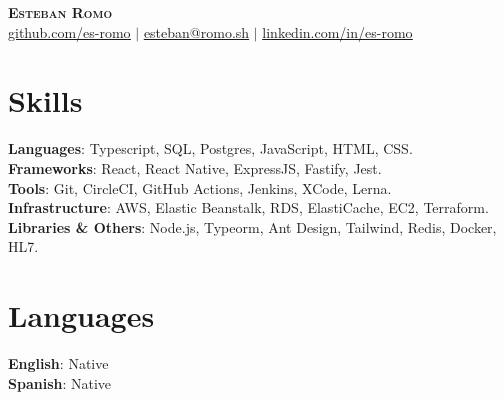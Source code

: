 \documentclass[letterpaper,11pt]{article}
\begin{document}
\begin{center}
    \textbf{\Huge \scshape Esteban Romo} \\ \vspace{1pt}
    \href{https://github.com/es-romo}{\underline{github.com/es-romo}} $|$ 
    \href{mailto:esteban@romo.sh}{\underline{esteban@romo.sh}} $|$ 
    \href{https://www.linkedin.com/in/es-romo/}{\underline{linkedin.com/in/es-romo}}
\end{center}

\begin{minipage}[t]{.78\textwidth}
  \section{Skills}
  \begin{itemize}[leftmargin=0.15in, label={}]
      \small{\item{
      \textbf{Languages}{: Typescript, SQL, Postgres, JavaScript, HTML, CSS.} \\
      \textbf{Frameworks}{: React, React Native, ExpressJS, Fastify, Jest.} \\
      \textbf{Tools}{: Git, CircleCI, GitHub Actions, Jenkins, XCode, Lerna.} \\
      \textbf{Infrastructure}{: AWS, Elastic Beanstalk, RDS, ElastiCache, EC2, Terraform.} \\
      \textbf{Libraries \& Others}{: Node.js, Typeorm, Ant Design, Tailwind, Redis, Docker, HL7.} \\
      }}
  \end{itemize}
\end{minipage}\hspace{.02\textwidth}%
\begin{minipage}[t]{.20\textwidth}
  \section{Languages}
  \begin{itemize}[leftmargin=0.0in, label={}]
      \small{\item{
      \textbf{English}{: Native} \\
      \textbf{Spanish}{: Native} \\
      }}
  \end{itemize}
\end{minipage}\vspace{-10pt}
\end{document}
